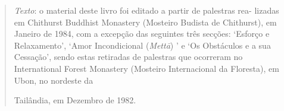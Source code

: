 \cleartorecto
\thispagestyle{empty}

\mbox{}\vfill

\begin{quote}
  \emph{Texto}: o material deste livro foi editado a partir de palestras rea-
  lizadas em Chithurst Buddhist Monastery (Mosteiro Budista de Chithurst), em
  Janeiro de 1984, com a excepção das seguintes três secções: `Esforço e
  Relaxamento', `Amor Incondicional (\emph{Mettā}) ' e `Os Obstáculos e a sua
  Cessação', sendo estas retiradas de palestras que ocorreram no International
  Forest Monastery (Mosteiro Internacional da Floresta), em Ubon, no nordeste da

  Tailândia, em Dezembro de 1982.
\end{quote}

\vfill\mbox{}